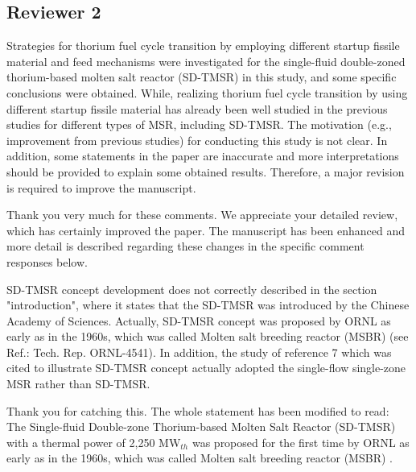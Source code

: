 \documentclass[answers,11pt]{exam}
\begin{document}
\begin{questions}
        \section*{Reviewer 2}

        \question Strategies for thorium fuel cycle transition by employing different startup fissile material and feed mechanisms were investigated for the single-fluid double-zoned thorium-based molten salt reactor (SD-TMSR) in this study, and some specific conclusions were obtained. While, realizing thorium fuel cycle transition by using different startup fissile material has already been well studied in the previous studies for different types of MSR, including SD-TMSR. The motivation (e.g., improvement from previous studies) for conducting this study is not clear. In addition, some statements in the paper are inaccurate and more interpretations should be provided to explain some obtained results. Therefore, a major revision is required to improve the manuscript.
        
        \begin{solution}
                Thank you very much for these comments. We appreciate your detailed review, which has certainly improved the paper. The manuscript has been enhanced and more detail is described regarding these changes in the specific comment responses below.
        \end{solution}


        \question SD-TMSR concept development does not correctly described in the section "introduction", where it states that the SD-TMSR was introduced by the Chinese Academy of Sciences. Actually, SD-TMSR concept was proposed by ORNL as early as in the 1960s, which was called Molten salt breeding reactor (MSBR) (see Ref.: Tech. Rep. ORNL-4541). In addition, the study of reference 7 which was cited to illustrate SD-TMSR concept actually adopted the single-flow single-zone MSR rather than SD-TMSR.
        
        \begin{solution}
                 Thank you for catching this. The whole statement has been modified to read:\\
                 The Single-fluid Double-zone Thorium-based Molten Salt Reactor (SD-TMSR) with a thermal power of 2,250
                 MW$_{th}$ was proposed for the first time by ORNL as early as in the 1960s, which was called Molten salt breeding reactor (MSBR) \cite{robertson_conceptual_1971}.
                 

\end{solution}
\end{questions}
\end{document}
